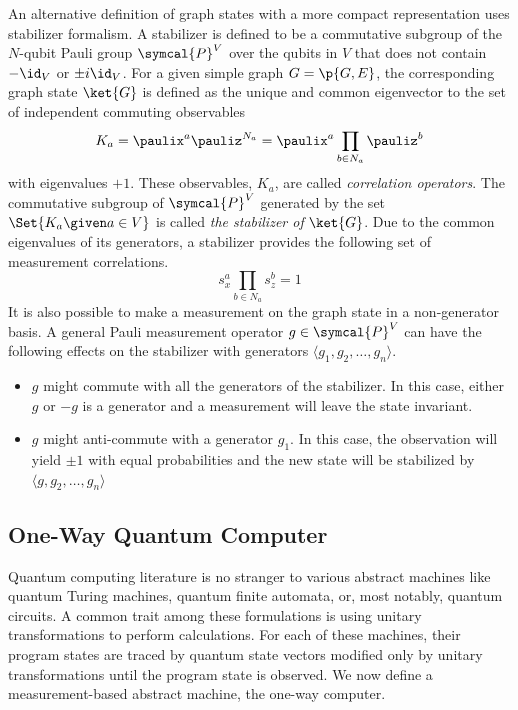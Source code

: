 An alternative definition of graph states with a more compact representation uses stabilizer formalism\cite{caves2014, quant-ph/9705052}. A stabilizer is defined to be a commutative subgroup of the \(N\)-qubit Pauli group \(\symcal{P}^V\) over the qubits in \(V\) that does not contain \(-\id_V\) or \(\pm i\id_V\)\cite{Briegel_2001,pusey2011}. For a given simple graph \(G=\p{G, E}\), the corresponding graph state \(\ket{G}\) is defined as the unique and common eigenvector to the set of independent commuting observables
\begin{equation}
  K_a = \paulix^a \pauliz^{N_a} = \paulix^a \prod_{b\in N_a} \pauliz^{b}
\end{equation}
with eigenvalues \(+1\). These observables, \(K_a\), are called \emph{correlation operators}. The commutative subgroup of \(\symcal{P}^V\) generated by the set \(\Set{K_a \given a \in V}\) is called \emph{the stabilizer of}\/ \(\ket{G}\). Due to the common eigenvalues of its generators, a stabilizer provides the following set of measurement correlations.
\begin{equation}
  s_x^a\prod_{b\in N_a}s_z^b = 1
\end{equation}
It is also possible to make a measurement on the graph state in a non-generator basis. A general Pauli measurement operator \(g\in\symcal{P}^V\) can have the following effects on the stabilizer with generators \(\langle g_1, g_2,\dots,g_n\rangle\)\cite{Nielsen2009}.
\begin{itemize}
  \item \(g\) might commute with all the generators of the stabilizer. In this case, either \(g\) or \(-g\) is a generator and a measurement will leave the state invariant.
  \item \(g\) might anti-commute with a generator \(g_1\). In this case, the observation will yield \(\pm1\) with equal probabilities and the new state will be stabilized by \(\langle g, g_2, \dots, g_n \rangle\)
\end{itemize}

\subsection{One-Way Quantum Computer}

Quantum computing literature is no stranger to various abstract machines like quantum Turing machines\cite{deutsch1985}, quantum finite automata\cite{SayY14}, or, most notably, quantum circuits. A common trait among these formulations is using unitary transformations to perform calculations. For each of these machines, their program states are traced by quantum state vectors modified only by unitary transformations until the program state is observed. We now define a measurement-based abstract machine, the one-way computer\cite{russendorf2001}.

